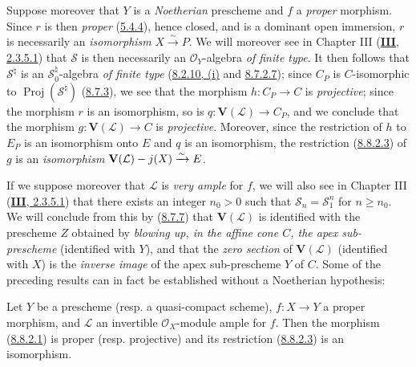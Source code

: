\begin{remark}[8.8.3]
\label{II.8.8.3}
Suppose moreover that $Y$ is a \emph{Noetherian} prescheme and $f$ a
\emph{proper} morphism. Since $r$ is then \emph{proper}
(\hyperref[II.5.4.4]{5.4.4}), hence closed, and is a dominant open
immersion, $r$ is necessarily an \emph{isomorphism}
$X\xrightarrow{\sim}P$. We will moreover see in Chapter III
(\hyperref[III.2.3.5.1]{\textbf{III}, 2.3.5.1}) that $\mathcal{S}$ is then
necessarily an $\mathcal{O}_Y$-algebra \emph{of finite type}. It then
follows that $\mathcal{S}^{\natural}$ is an
$\mathcal{S}_0^{\natural}$-algebra \emph{of finite type}
(\hyperref[II.8.2.10]{8.2.10, (i)} and
\hyperref[II.8.7.2.7]{8.7.2.7}); since $C_P$ is $C$-isomorphic to
$\operatorname{Proj}(\mathcal{S}^{\natural})$
(\hyperref[II.8.7.3]{8.7.3}), we see that the morphism $h:C_P\to C$ is
\emph{projective}; since the morphism $r$ is an isomorphism, so is
$q:\mathbf{V}(\mathcal{L})\to C_P$, and we conclude that the morphism
$g:\mathbf{V}(\mathcal{L})\to C$ is \emph{projective}. Moreover, since the
restriction of $h$ to $E_P$ is an isomorphism onto $E$ and $q$ is an
isomorphism, the restriction (\hyperref[II.8.8.2.3]{8.8.2.3}) of $g$ is an
\emph{isomorphism}
$\mathbf{V}(\mathcal{L})- j(X)\xrightarrow{\sim}E$.

If we suppose moreover that $\mathcal{L}$ is \emph{very ample} for $f$, we
will also see in Chapter III (\hyperref[III.2.3.5.1]{\textbf{III}, 2.3.5.1}) that
there exists an integer $n_0>0$ such that
$\mathcal{S}_n=\mathcal{S}_1^n$ for $n\geqslant n_0$. We will conclude from
this by (\hyperref[II.8.7.7]{8.7.7}) that $\mathbf{V}(\mathcal{L})$ is
identified with the prescheme $Z$ obtained by \emph{blowing up, in the affine
cone $C$, the apex sub-prescheme} (identified with $Y$), and that the
\emph{zero section} of $\mathbf{V}(\mathcal{L})$ (identified with $X$) is
the \emph{inverse image} of the apex sub-prescheme $Y$ of $C$. Some of the
preceding results can in fact be established without a Noetherian
hypothesis:
\end{remark}

\begin{corollary}[8.8.4]
\label{II.8.8.4}
Let $Y$ be a prescheme \textup{(resp.} a quasi-compact scheme\textup{)}, $f:X\to Y$ a proper
morphism, and $\mathcal{L}$ an invertible $\mathcal{O}_X$-module ample for
$f$. Then the morphism \textup{(\hyperref[II.8.8.2.1]{8.8.2.1})} is proper \textup{(resp.}
projective\textup{)} and its restriction \textup{(\hyperref[II.8.8.2.3]{8.8.2.3})} is an
isomorphism.
\end{corollary}


